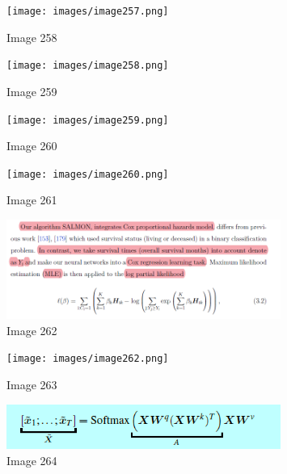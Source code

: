 \documentclass{article}%
\begin{document}
%


\begin{figure}[h!]%
\centering%
\texttt{[image: images/image257.png]}%
\caption{Image 258}%
\end{figure}

%


\begin{figure}[h!]%
\centering%
\texttt{[image: images/image258.png]}%
\caption{Image 259}%
\end{figure}

%


\begin{figure}[h!]%
\centering%
\texttt{[image: images/image259.png]}%
\caption{Image 260}%
\end{figure}

%


\begin{figure}[h!]%
\centering%
\texttt{[image: images/image260.png]}%
\caption{Image 261}%
\end{figure}

%


\begin{figure}[h!]%
\centering%
\includegraphics[width=0.8\textwidth]{images/image261.png}%
\caption{Image 262}%
\end{figure}

%


\begin{figure}[h!]%
\centering%
\texttt{[image: images/image262.png]}%
\caption{Image 263}%
\end{figure}

%


\begin{figure}[h!]%
\centering%
\includegraphics[width=0.8\textwidth]{images/image263.png}%
\caption{Image 264}%
\end{figure}

%
\end{document}
